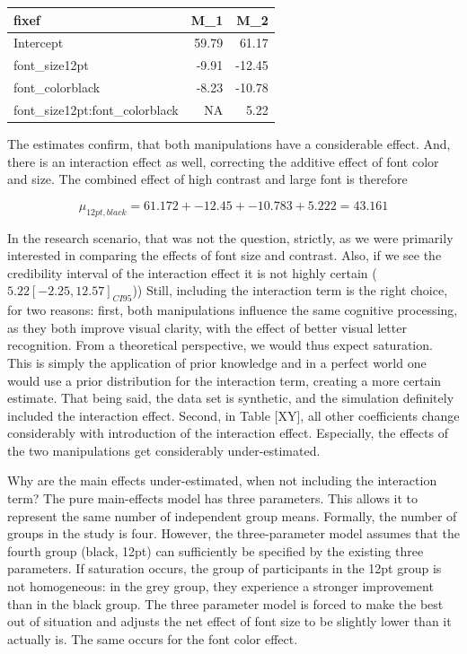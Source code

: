 \documentclass[]{svmono}
\theoremstyle{definition}
\theoremstyle{definition}
\theoremstyle{definition}
\theoremstyle{remark}
\begin{document}
\begin{longtable}[]{@{}lrr@{}}
\toprule
fixef & M\_1 & M\_2\tabularnewline
\midrule
\endhead
Intercept & 59.79 & 61.17\tabularnewline
font\_size12pt & -9.91 & -12.45\tabularnewline
font\_colorblack & -8.23 & -10.78\tabularnewline
font\_size12pt:font\_colorblack & NA & 5.22\tabularnewline
\bottomrule
\end{longtable}

The estimates confirm, that both manipulations have a considerable
effect. And, there is an interaction effect as well, correcting the
additive effect of font color and size. The combined effect of high
contrast and large font is therefore

\[
\mu_{12pt, black} =
61.172 + -12.45 + 
-10.783 + 5.222 = 
43.161
\]

In the research scenario, that was not the question, strictly, as we
were primarily interested in comparing the effects of font size and
contrast. Also, if we see the credibility interval of the interaction
effect it is not highly certain (\(5.22 [-2.25, 12.57]_{CI95}\))) Still,
including the interaction term is the right choice, for two reasons:
first, both manipulations influence the same cognitive processing, as
they both improve visual clarity, with the effect of better visual
letter recognition. From a theoretical perspective, we would thus expect
saturation. This is simply the application of prior knowledge and in a
perfect world one would use a prior distribution for the interaction
term, creating a more certain estimate. That being said, the data set is
synthetic, and the simulation definitely included the interaction
effect. Second, in Table {[}XY{]}, all other coefficients change
considerably with introduction of the interaction effect. Especially,
the effects of the two manipulations get considerably under-estimated.

Why are the main effects under-estimated, when not including the
interaction term? The pure main-effects model has three parameters. This
allows it to represent the same number of independent group means.
Formally, the number of groups in the study is four. However, the
three-parameter model assumes that the fourth group (black, 12pt) can
sufficiently be specified by the existing three parameters. If
saturation occurs, the group of participants in the 12pt group is not
homogeneous: in the grey group, they experience a stronger improvement
than in the black group. The three parameter model is forced to make the
best out of situation and adjusts the net effect of font size to be
slightly lower than it actually is. The same occurs for the font color
effect.
\end{document}
